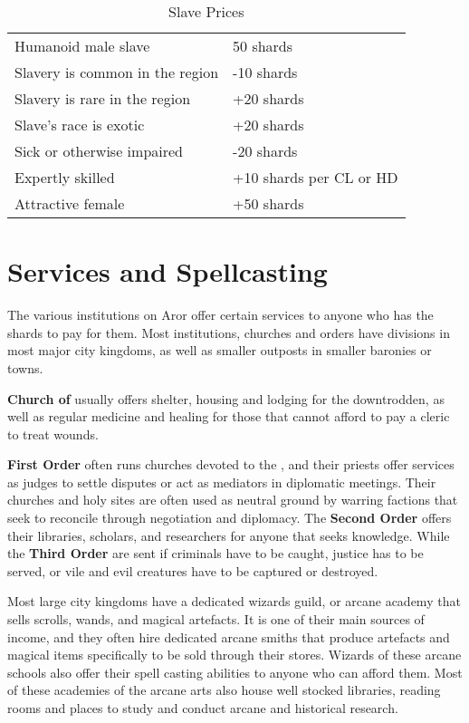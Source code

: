 \begin{table*}
  \caption{Slave Prices} \label{tbl:Slave Prices}
  \begin{tabular}{p{10cm} l}
    Humanoid male slave             &  50 shards \\
    Slavery is common in the region & -10 shards \\
    Slavery is rare in the region   & +20 shards \\
    Slave's race is exotic          & +20 shards \\
    Sick or otherwise impaired      & -20 shards \\
    Expertly skilled                & +10 shards per CL or HD \\
    Attractive female               & +50 shards
  \end{tabular}
\end{table*}

\section{Services and Spellcasting}
\label{sec:Services}

The various institutions on Aror offer certain services to anyone who has the
shards to pay for them. Most institutions, churches and orders have divisions
in most major city kingdoms, as well as smaller outposts in smaller baronies
or towns.

\textbf{Church of } usually offers shelter, housing and
lodging for the downtrodden, as well as regular medicine and healing for those
that cannot afford to pay a cleric to treat wounds.

\textbf{First Order} often runs churches devoted to the ,
and their priests offer services as judges to settle disputes or act as
mediators in diplomatic meetings. Their churches and holy sites are often
used as neutral ground by warring factions that seek to reconcile through
negotiation and diplomacy. The \textbf{Second Order} offers their libraries,
scholars, and researchers for anyone that seeks knowledge. While the
\textbf{Third Order} are sent if criminals have to be caught, justice has to
be served, or vile and evil creatures have to be captured or destroyed.

Most large city kingdoms have a dedicated wizards guild, or arcane academy
that sells scrolls, wands, and magical artefacts. It is one of their main
sources of income, and they often hire dedicated arcane smiths that produce
artefacts and magical items specifically to be sold through their stores.
Wizards of these arcane schools also offer their spell casting abilities to
anyone who can afford them. Most of these academies of the arcane arts also
house well stocked libraries, reading rooms and places to study and conduct
arcane and historical research.

